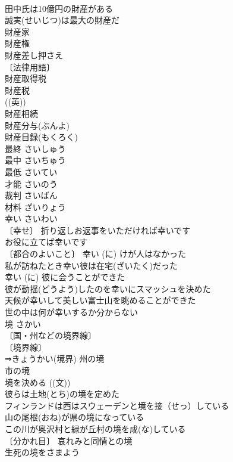 \documentclass[8pt]{extreport}
\begin{document}
\begin{CJK}{UTF8}{min}
\\	田中氏は10億円の財産がある 
\\	誠実(せいじつ)は最大の財産だ 
\\	財産家 
\\	財産権 
\\	財産差し押さえ 
\\	〔法律用語〕
\\	財産取得税 
\\	財産税 
\\	((英)) 
\\	財産相続 
\\	財産分与(ぶんよ) 
\\	財産目録(もくろく) 
\\	最終	さいしゅう	
\\	最中	さいちゅう	
\\	最低	さいてい	
\\	才能	さいのう	
\\	裁判	さいばん	
\\	材料	ざいりょう	
\\	幸い	さいわい	
\\	〔幸せ〕 折り返しお返事をいただければ幸いです 
\\	お役に立てば幸いです 
\\	〔都合のよいこと〕 幸い (に) けが人はなかった 
\\	私が訪ねたとき幸い彼は在宅(ざいたく)だった 
\\	幸い (に) 彼に会うことができた 
\\	彼が動揺(どうよう)したのを幸いにスマッシュを決めた 
\\	天候が幸いして美しい富士山を眺めることができた 
\\	世の中は何が幸いするか分からない 
\\	境	さかい	
\\	〔国・州などの境界線〕
\\	〔境界線〕
\\	⇒きょうかい(境界) 州の境 
\\	市の境 
\\	境を決める ((文)) 
\\	彼らは土地(とち)の境を定めた 
\\	フィンランドは西はスウェーデンと境を接（せっ）している 
\\	山の尾根(おね)が県の境になっている 
\\	この川が奥沢村と緑が丘村の境を成(な)している 
\\	〔分かれ目〕 哀れみと同情との境 
\\	生死の境をさまよう 

\end{CJK}
\end{document}
